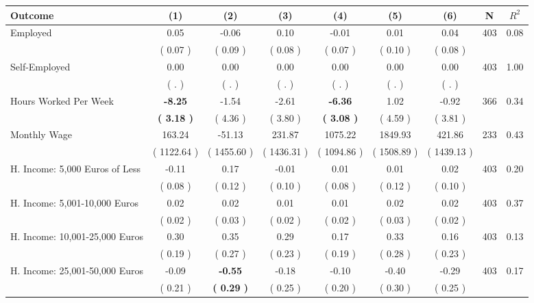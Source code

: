 \begin{tabular}{lcccccccc}
\toprule
 \textbf{Outcome} & \textbf{(1)} & \textbf{(2)} & \textbf{(3)} & \textbf{(4)} & \textbf{(5)} & \textbf{(6)} & \textbf{N} & \textbf{$ R^2$} \\
\midrule
Employed &      0.05 &     -0.06 &      0.10 &     -0.01 &      0.01 &      0.04 & 403 &       0.08 \\ 
 & (     0.07 ) & (     0.09 ) & (     0.08 ) & (     0.07 ) & (     0.10 ) & (     0.08 ) & \\
Self-Employed &      0.00 &      0.00 &      0.00 &      0.00 &      0.00 &      0.00 & 403 &       1.00 \\ 
 & (        . ) & (        . ) & (        . ) & (        . ) & (        . ) & (        . ) & \\
Hours Worked Per Week & \textbf{    -8.25} &     -1.54 &     -2.61 & \textbf{    -6.36} &      1.02 &     -0.92 & 366 &       0.34 \\ 
 & \textbf{(     3.18 )} & (     4.36 ) & (     3.80 ) & \textbf{(     3.08 )} & (     4.59 ) & (     3.81 ) & \\
Monthly Wage &    163.24 &    -51.13 &    231.87 &   1075.22 &   1849.93 &    421.86 & 233 &       0.43 \\ 
 & (  1122.64 ) & (  1455.60 ) & (  1436.31 ) & (  1094.86 ) & (  1508.89 ) & (  1439.13 ) & \\
H. Income: 5,000 Euros of Less &     -0.11 &      0.17 &     -0.01 &      0.01 &      0.01 &      0.02 & 403 &       0.20 \\ 
 & (     0.08 ) & (     0.12 ) & (     0.10 ) & (     0.08 ) & (     0.12 ) & (     0.10 ) & \\
H. Income: 5,001-10,000 Euros &      0.02 &      0.02 &      0.01 &      0.01 &      0.02 &      0.02 & 403 &       0.37 \\ 
 & (     0.02 ) & (     0.03 ) & (     0.02 ) & (     0.02 ) & (     0.03 ) & (     0.02 ) & \\
H. Income: 10,001-25,000 Euros &      0.30 &      0.35 &      0.29 &      0.17 &      0.33 &      0.16 & 403 &       0.13 \\ 
 & (     0.19 ) & (     0.27 ) & (     0.23 ) & (     0.19 ) & (     0.28 ) & (     0.23 ) & \\
H. Income: 25,001-50,000 Euros &     -0.09 & \textbf{    -0.55} &     -0.18 &     -0.10 &     -0.40 &     -0.29 & 403 &       0.17 \\ 
 & (     0.21 ) & \textbf{(     0.29 )} & (     0.25 ) & (     0.20 ) & (     0.30 ) & (     0.25 ) & \\

\end{tabular}
